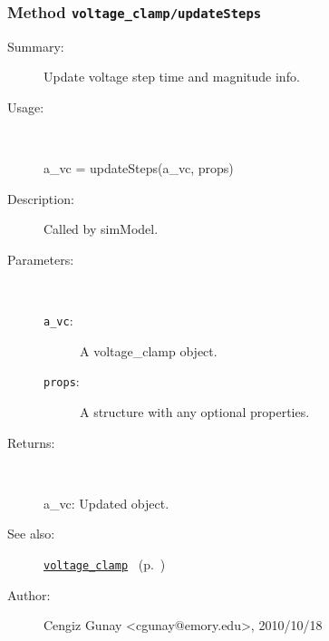 \subsubsection[Method \texttt{updateSteps}]{Method \texttt{voltage\_clamp/updateSteps}}%
%
\label{ref_voltage_clamp__updateSteps}%
\hypertarget{ref_voltage_clamp__updateSteps}{}%
\begin{description}
\item[Summary:]Update voltage step time and magnitude info.
%
\item[Usage:]~%
\begin{lyxcode}%
a\_vc = updateSteps(a\_vc, props)
%
\end{lyxcode}%
%
\item[Description:]%
Called by simModel.
\item[Parameters:]~
\begin{description}%
\item[\texttt{a\_vc}:]
 A voltage\_clamp object.
\item[\texttt{props}:]
 A structure with any optional properties.
\end{description}%
%
\item[Returns:
]~

   a\_vc: Updated object.
%
%
\item[See also:]%
\hyperlink{ref_voltage_clamp}{\texttt{voltage\_clamp}}%
\ (p.~\pageref{ref_voltage_clamp})%
%
%
\item[Author:]%
Cengiz Gunay <cgunay@emory.edu>, 2010/10/18
%
\end{description}
\methodline%
